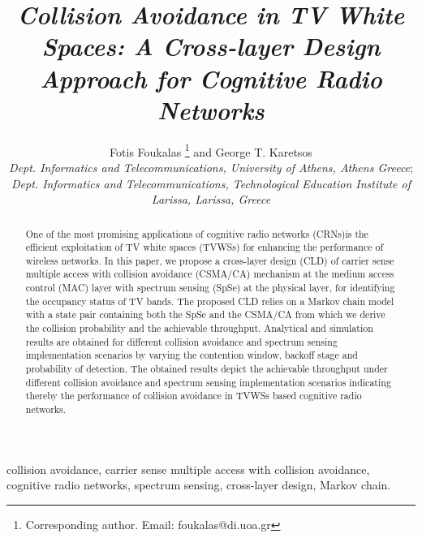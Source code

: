 \documentclass
[journal,11pt,draftclsnofoot,onecolumn,doublespace]{tETN2e}
\begin{document}
\title{{\itshape Collision Avoidance in TV White Spaces: A Cross-layer Design Approach for Cognitive Radio Networks } }

\author{Fotis Foukalas  \thanks{Corresponding author. Email: foukalas@di.uoa.gr \vspace{6pt}} and George T. Karetsos\\\vspace{6pt} {\em{Dept. Informatics and  Telecommunications, University of Athens, Athens Greece}}; \\
{\em{Dept. Informatics and Telecommunications, Technological Education Institute of Larissa, Larissa, Greece}}\\\vspace{6pt} }

\maketitle
\begin{abstract}
One of the most promising applications of cognitive radio networks (CRNs)is the efficient exploitation of TV white spaces (TVWSs) for enhancing the performance of wireless networks. In this paper, we propose a cross-layer design (CLD) of  carrier sense multiple access with collision avoidance (CSMA/CA) mechanism at the medium access control (MAC) layer with spectrum sensing (SpSe) at the physical layer, for identifying the occupancy status of TV bands. The proposed CLD relies on a Markov chain model with a state pair containing both the SpSe and the CSMA/CA from which we derive the collision probability and the achievable throughput. Analytical and simulation  results are obtained for different collision avoidance and spectrum sensing implementation scenarios  by varying the contention window, backoff stage and probability of detection. The obtained results depict the achievable throughput under different collision avoidance and spectrum sensing implementation scenarios indicating thereby the performance of collision avoidance in TVWSs based cognitive radio networks. 
\end{abstract}

\begin{keywords}
collision avoidance, carrier sense multiple access with collision avoidance, cognitive radio networks, spectrum sensing, cross-layer design, Markov chain. 
\end{keywords}
   
\end{document}
